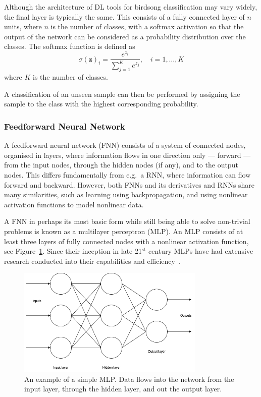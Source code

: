 Although the architecture of DL tools for birdsong classification may vary
widely, the final layer is typically the same. This consists of a fully
connected layer of $n$ units, where $n$ is the number of classes, with a softmax
activation so that the output of the network can be considered as a probability
distribution over the classes. The softmax function is defined as
\begin{equation}
\sigma{(\mathbf{z})}_i = \frac{e^{z_i}}
  {\sum_{j=1}^{K} e^{z_j}}, \hspace{1em} i = 1,\ldots,K
\end{equation}
where $K$ is the number of classes.

A classification of an unseen sample can then be performed by assigning the
sample to the class with the highest corresponding probability.

\subsubsection{Feedforward Neural Network}

A feedforward neural network (FNN) consists of a system of connected nodes,
organised in layers, where information flows in one direction only --- forward
--- from the input nodes, through the hidden nodes (if any), and to the output
nodes. This differs fundamentally from e.g.\ a RNN, where information can flow
forward and backward. However, both FNNs and its derivatives and RNNs share
many similarities, such as learning using backpropagation, and using nonlinear
activation functions to model nonlinear data.

A FNN in perhaps its most basic form while still being able to solve non-trivial
problems is known as a multilayer perceptron (MLP). An MLP consists of at least
three layers of fully connected nodes with a nonlinear activation function, see
Figure~\ref{fig:mlp}. Since their inception in late 21$^{\text{st}}$ century
MLPs have had extensive research conducted into their capabilities and
efficiency~\cite{hornik1989multilayer}.

\begin{figure}[ht]
  \centering
  \includegraphics[width=0.8\textwidth]{figures/mlp.png}
  \caption{An example of a simple MLP\@. Data flows into the network from the
  input layer, through the hidden layer, and out the output layer.}\label{fig:mlp}
\end{figure}

